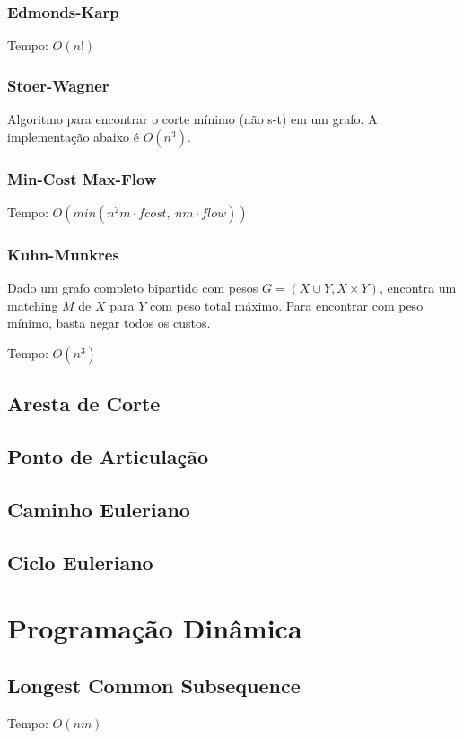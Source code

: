 \documentclass[12pt,a4paper]{article}
\begin{document}
			\subsubsection{Edmonds-Karp}
				Tempo: \( O(n!) \) %
				
			\subsubsection{Stoer-Wagner}
				Algoritmo para encontrar o corte mínimo (não s-t) em um grafo. A implementação abaixo é \(O(n^3)\).
				
			\subsubsection{Min-Cost Max-Flow}
				Tempo: \( O(min(n^2 m \cdot fcost, ~ n m \cdot flow) ) \)
				
			\subsubsection{Kuhn-Munkres}
				Dado um grafo completo bipartido com pesos $ G = (X \cup Y, X \times Y) $, encontra um matching $M$ de $X$ para $Y$ com peso total máximo. Para encontrar com peso mínimo, basta negar todos os custos.

				Tempo: \( O(n^3) \)
				
		\subsection{Aresta de Corte}
			
		\subsection{Ponto de Articulação}
			
		\subsection{Caminho Euleriano}
		\subsection{Ciclo Euleriano}

	\section{Programação Dinâmica}
		\subsection{Longest Common Subsequence}
			Tempo: \( O(nm) \)
			
\end{document}
